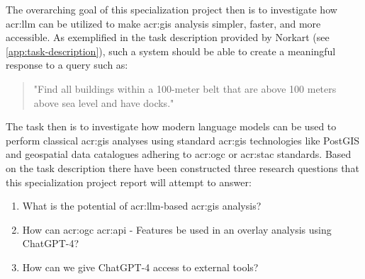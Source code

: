 The overarching goal of this specialization project then is to investigate how \acrfull{acr:llm} can be utilized to make \acrshort{acr:gis} analysis simpler, faster, and more accessible. As exemplified in the task description provided by Norkart (see \cref{app:task-description}), such a system should be able to create a meaningful response to a query such as:

\begin{quote}
    "Find all buildings within a 100-meter belt that are above 100 meters above sea level and have docks."
\end{quote}

The task then is to investigate how modern language models can be used to perform classical \acrshort{acr:gis} analyses using standard \acrshort{acr:gis} technologies like PostGIS and geospatial data catalogues adhering to \acrshort{acr:ogc} or \acrshort{acr:stac} standards. Based on the task description there have been constructed three research questions that this specialization project report will attempt to answer:

\begin{enumerate}
    \item What is the potential of \acrshort{acr:llm}-based \acrshort{acr:gis} analysis? \label{rq:llm-potential}
    \item How can \acrshort{acr:ogc} \acrshort{acr:api} - Features be used in an overlay analysis using ChatGPT-4? \label{rq:overlay-analysis}
    \item How can we give ChatGPT-4 access to external tools? \label{rq:external-tools}
\end{enumerate}


